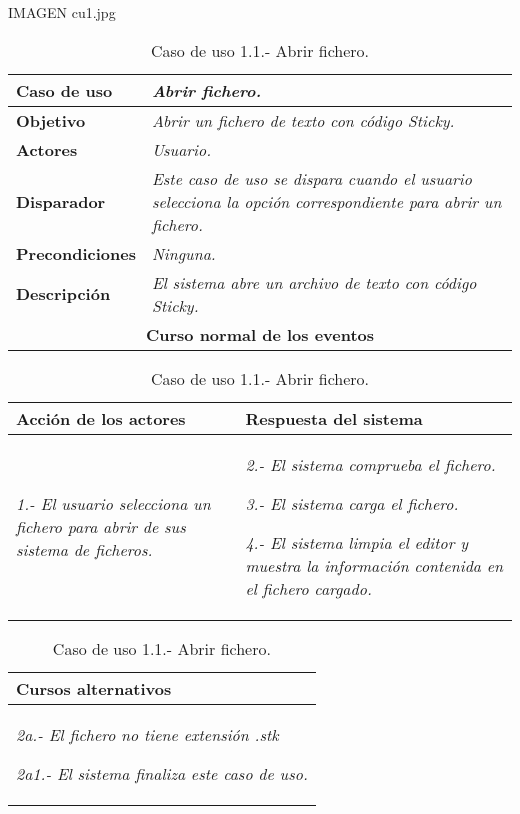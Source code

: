 \documentclass[twoside,a4paper,11pt]{book}
\begin{document}
IMAGEN cu1.jpg

\begin{table}[!ht]
    \centering
    \begin{tabular}{|p{4cm}|p{11.5cm}|}
    \hline

    \textbf{Caso de uso} & \textit{Abrir fichero.}\\
    \hline

    \textbf{Objetivo} & \textit{Abrir un fichero de texto con código Sticky.}\\
    \hline

    \textbf{Actores} & \textit{Usuario.}\\
    \hline

    \textbf{Disparador} & \textit{Este caso de uso se dispara cuando el usuario selecciona la opción correspondiente para abrir un fichero.}\\
    \hline

    \textbf{Precondiciones} & \textit{Ninguna.}\\
    \hline

    \textbf{Descripción} & \textit{El sistema abre un archivo de texto con código Sticky.}\\
    \hline

    \multicolumn{2}{|c|}{\textbf{Curso normal de los eventos}}\\
    \hline

    \end{tabular}
    \begin{tabular}{|p{7.75cm}|p{7.75cm}|}
    \hspace{2cm}\textbf{Acción de los actores} & \hspace{1.75cm}\textbf{Respuesta del sistema}\\
    \hline

    \textit{1.- El usuario selecciona un fichero para abrir de sus sistema de ficheros.}
    &
    \textit{2.- El sistema comprueba el fichero.}

    \textit{3.- El sistema carga el fichero.}

    \textit{4.- El sistema limpia el editor y muestra la información contenida en el fichero cargado.}

    \\
    \hline
    \end{tabular}

    \begin{tabular}{|p{15.9cm}|}
      \hspace{6cm}\textbf{Cursos alternativos}\\
      \hline
     
	\textit{2a.- El fichero no tiene extensión .stk}

	\textit{  2a1.- El sistema finaliza este caso de uso.}
      \\
      \hline
    \end{tabular}
    \caption{Caso de uso 1.1.- Abrir fichero.}
\end{table}
\end{document}
